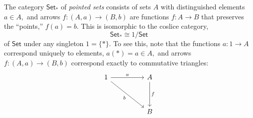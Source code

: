 \example{}The category $\mathsf{Set}_*$ of \emph{pointed sets} consists of sets $A$ with distinguished elements $a \in A,$ and arrows $f:(A, a) \to (B, b)$ are functions $f:A\to B$ that preserves the ``points,'' $f(a) = b.$ This is isomorphic to the coslice category,
\begin{equation*} 
	\mathsf{Set}_* \cong 1/\mathsf{Set}
\end{equation*}
of $\mathsf{Set}$ under any singleton $1 = \{*\}.$ To see this, note that the functions $a:1\to A$ correspond uniquely to elements, $a(*) = a \in A,$ and arrows $f:(A, a) \to (B, b)$ correspond exactly to commutative triangles:
\begin{equation*} 
	\begin{tikzcd}
1 \arrow[rr, "a"] \arrow[rrdd, "b"'] &  & A \arrow[dd, "f"] \\
                                     &  &                   \\
                                     &  & B                
\end{tikzcd}
\end{equation*}
